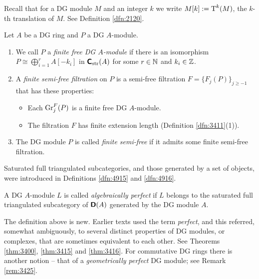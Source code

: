 Recall that for a DG module $M$ and an integer $k$ we write  
$M[k] := \operatorname{T}^k(M)$, the $k$-th translation of $M$. See Definition 
\ref{dfn:2120}.

\begin{dfn} \label{dfn:3402}
Let $A$ be a DG ring and $P$ a DG $A$-module. 
\begin{enumerate}
\item We call $P$ a {\em finite free DG $A$-module} 
if there is an isomorphism 
$P \cong \bigoplus_{i = 1}^r A[-k_i]$
in $\boldsymbol{\mathsf{C}}_{\mathrm{str}}(A)$ for some $r \in \mathbb{N}$ and $k_i \in \mathbb{Z}$. 

\item A {\em finite semi-free filtration} 
on $P$ is a semi-free filtration 
$F = \bigl\{ F_j(P) \bigr\}_{j \geq -1}$ that has these properties:
\begin{itemize}
\item Each $\operatorname{Gr}^F_j(P)$ is a finite free DG $A$-module.

\item The filtration $F$ has finite extension length (Definition 
\ref{dfn:3411}(1)). 
\end{itemize}

\item The DG module $P$ is called {\em finite semi-free} 
if it admits 
some finite semi-free filtration. 
\end{enumerate}
\end{dfn}

Saturated full triangulated subcategories, and those generated by a set of 
objects, were introduced in Definitions \ref{dfn:4915} and \ref{dfn:4916}.

\begin{dfn} \label{dfn:3401}
A DG $A$-module $L$ is called {\em algebraically perfect} 
if $L$ belongs to the saturated full triangulated  subcategory of $\boldsymbol{\mathsf{D}}(A)$ 
generated by the DG module $A$. 
\end{dfn}

\begin{rem} \label{rem:3491}
The definition above is new. Earlier texts used the term {\em perfect}, and  
this referred, somewhat ambiguously, to several distinct properties of DG 
modules, or complexes, that are sometimes equivalent to each other. See Theorems 
\ref{thm:3400}, \ref{thm:3415} and \ref{thm:3416}. For commutative DG rings 
there is another notion -- that of a {\em geometrically perfect} DG module; see 
Remark \ref{rem:3425}. 
\end{rem}

